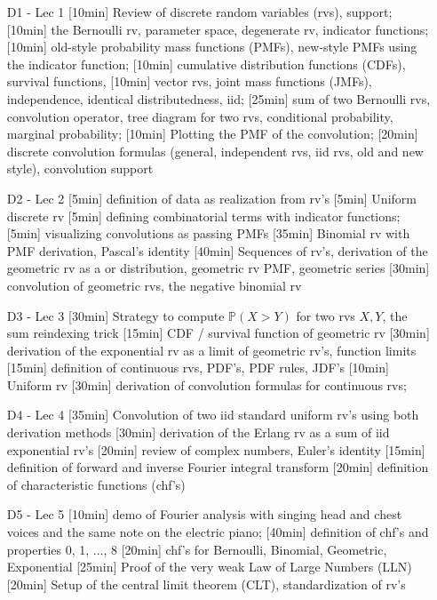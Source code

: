 \begin{enumerate}
\item[D1 - Lec 1] [10min] Review of discrete random variables (rvs), support; [10min] the Bernoulli rv, parameter space, degenerate rv, indicator functions; [10min] old-style probability mass functions (PMFs), new-style PMFs using the indicator function; [10min] cumulative distribution functions (CDFs), survival functions, [10min] vector rvs, joint mass functions (JMFs), independence, identical distributedness, iid; [25min] sum of two Bernoulli rvs, convolution operator, tree diagram for two rvs, conditional probability, marginal probability; [10min] Plotting the PMF of the convolution; [20min] discrete convolution formulas (general, independent rvs, iid rvs, old and new style), convolution support

\item[D2 - Lec 2] [5min] definition of data as realization from rv's [5min] Uniform discrete rv  [5min] defining combinatorial terms with indicator functions; [5min] visualizing convolutions as passing PMFs  [35min] Binomial rv with PMF derivation, Pascal's identity [40min] Sequences of rv's, derivation of the geometric rv as a  or  distribution, geometric rv PMF, geometric series [30min] convolution of geometric rvs, the negative binomial rv

\item[D3 - Lec 3] [30min] Strategy to compute $\mathbb{P}(X > Y)$ for two rvs $X, Y$, the sum reindexing trick [15min] CDF / survival function of geometric rv [30min] derivation of the exponential rv as a limit of geometric rv's, function limits [15min] definition of continuous rvs, PDF's, PDF rules, JDF's [10min] Uniform rv [30min] derivation of convolution formulas for continuous rvs;

\item[D4 - Lec 4] [35min] Convolution of two iid standard uniform rv's using both derivation methods [30min] derivation of the Erlang rv as a sum of iid exponential rv's [20min] review of complex numbers, Euler's identity  [15min] definition of forward and inverse Fourier integral transform [20min] definition of characteristic functions (chf's)  
 
\item[D5 - Lec 5] [10min] demo of Fourier analysis with singing head and chest voices and the same note on the electric piano; [40min] definition of chf's and properties 0, 1, ..., 8 [20min] chf's for Bernoulli, Binomial, Geometric, Exponential [25min] Proof of the very weak Law of Large Numbers (LLN) [20min] Setup of the central limit theorem (CLT), standardization of rv's


\end{enumerate}

